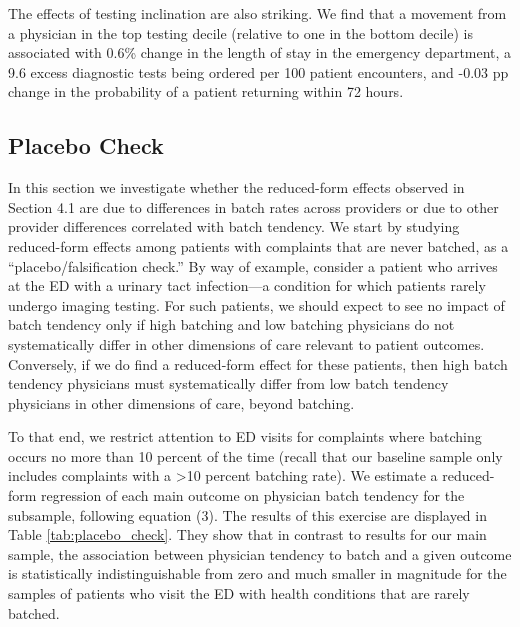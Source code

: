 \documentclass[,,nonblindrev]{informs}
\begin{document}
The effects of testing inclination are also striking. We find that a
movement from a physician in the top testing decile (relative to one in
the bottom decile) is associated with 0.6\% change in the length of stay
in the emergency department, a 9.6 excess diagnostic tests being ordered
per 100 patient encounters, and -0.03 pp change in the probability of a
patient returning within 72 hours.

\hypertarget{placebo-check}{%
\subsection{Placebo Check}\label{placebo-check}}

In this section we investigate whether the reduced-form effects observed
in Section 4.1 are due to differences in batch rates across providers or
due to other provider differences correlated with batch tendency. We
start by studying reduced-form effects among patients with complaints
that are never batched, as a ``placebo/falsification check.'' By way of
example, consider a patient who arrives at the ED with a urinary tact
infection---a condition for which patients rarely undergo imaging
testing. For such patients, we should expect to see no impact of batch
tendency only if high batching and low batching physicians do not
systematically differ in other dimensions of care relevant to patient
outcomes. Conversely, if we do find a reduced-form effect for these
patients, then high batch tendency physicians must systematically differ
from low batch tendency physicians in other dimensions of care, beyond
batching.

To that end, we restrict attention to ED visits for complaints where
batching occurs no more than 10 percent of the time (recall that our
baseline sample only includes complaints with a \textgreater10 percent
batching rate). We estimate a reduced-form regression of each main
outcome on physician batch tendency for the subsample, following
equation (3). The results of this exercise are displayed in Table
\ref{tab:placebo_check}. They show that in contrast to results for our
main sample, the association between physician tendency to batch and a
given outcome is statistically indistinguishable from zero and much
smaller in magnitude for the samples of patients who visit the ED with
health conditions that are rarely batched.
\end{document}
